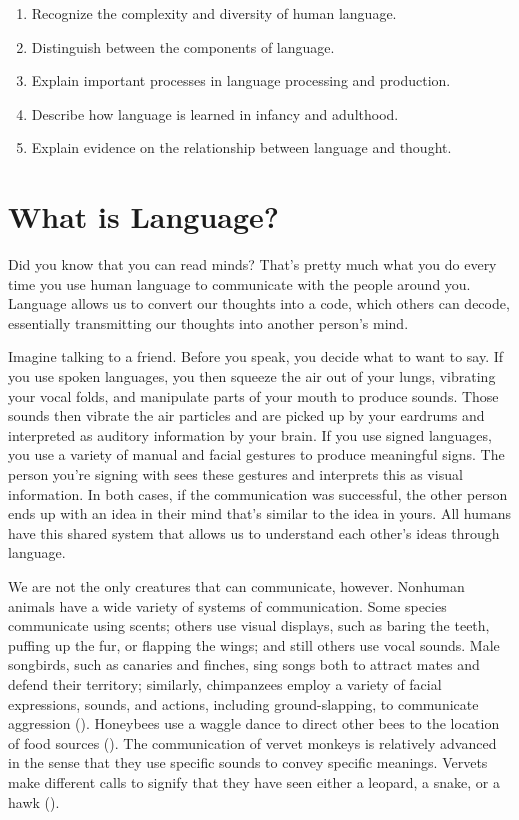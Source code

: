 \documentclass[
]{krantz}
\providecommand{\tightlist}{%
  \setlength{\itemsep}{0pt}\setlength{\parskip}{0pt}}
\begin{document}
\begin{enumerate}
\def\labelenumi{\arabic{enumi}.}
\tightlist
\item
  Recognize the complexity and diversity of human language.
\item
  Distinguish between the components of language.
\item
  Explain important processes in language processing and production.
\item
  Describe how language is learned in infancy and adulthood.
\item
  Explain evidence on the relationship between language and thought.
\end{enumerate}

\section{What is Language?}\label{what-is-language}

Did you know that you can read minds? That's pretty much what you do every time you use human language to communicate with the people around you. Language allows us to convert our thoughts into a code, which others can decode, essentially transmitting our thoughts into another person's mind.

Imagine talking to a friend. Before you speak, you decide what to want to say. If you use spoken languages, you then squeeze the air out of your lungs, vibrating your vocal folds, and manipulate parts of your mouth to produce sounds. Those sounds then vibrate the air particles and are picked up by your eardrums and interpreted as auditory information by your brain. If you use signed languages, you use a variety of manual and facial gestures to produce meaningful signs. The person you're signing with sees these gestures and interprets this as visual information. In both cases, if the communication was successful, the other person ends up with an idea in their mind that's similar to the idea in yours. All humans have this shared system that allows us to understand each other's ideas through language.

We are not the only creatures that can communicate, however. Nonhuman animals have a wide variety of systems of communication. Some species communicate using scents; others use visual displays, such as baring the teeth, puffing up the fur, or flapping the wings; and still others use vocal sounds. Male songbirds, such as canaries and finches, sing songs both to attract mates and defend their territory; similarly, chimpanzees employ a variety of facial expressions, sounds, and actions, including ground-slapping, to communicate aggression (). Honeybees use a waggle dance to direct other bees to the location of food sources (). The communication of vervet monkeys is relatively advanced in the sense that they use specific sounds to convey specific meanings. Vervets make different calls to signify that they have seen either a leopard, a snake, or a hawk ().
\end{document}
